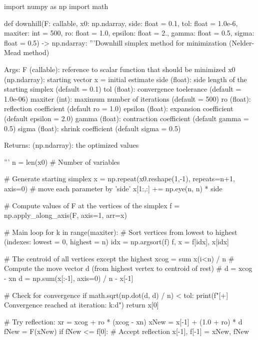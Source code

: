 \begin{python}
import numpy as np
import math

def downhill(F: callable, x0: np.ndarray,
     side: float = 0.1, tol: float = 1.0e-6, maxiter: int = 500,
     ro: float = 1.0, epsilon: float = 2.,
     gamma: float = 0.5, sigma: float = 0.5) -> np.ndarray:
    '''Downhill simplex method for minimization (Nelder-Mead method)

    Args:
        F (callable):    reference to scalar function that should be minimized
        x0 (np.ndarray): starting vector x = initial estimate
        side (float):    side length of the starting simplex (default = 0.1)
        tol (float):     convergence toelerance (default = 1.0e-06)
        maxiter (int):   maximum number of iterations (default = 500)
        ro (float):      reflection coefficient   (default ro      = 1.0)
        epsilon (float): expansion coefficient    (default epsilon = 2.0)
        gamma (float):   contraction coefficient  (default gamma   = 0.5)
        sigma (float):   shrink coefficient       (default sigma   = 0.5)

    Returns:
        (np.ndarray): the optimized values

    '''
    n = len(x0) # Number of variables

    # Generate starting simplex
    x = np.repeat(x0.reshape(1,-1), repeats=n+1, axis=0)
    # move each parameter by 'side'
    x[1:,:] += np.eye(n, n) * side

    # Compute values of F at the vertices of the simplex
    f = np.apply_along_axis(F, axis=1, arr=x)

    # Main loop
    for k in range(maxiter):
        # Sort vertices from lowest to highest (indexes: lowest = 0, highest = n)
        idx = np.argsort(f)
        f, x = f[idx], x[idx]

        # The centroid of all vertices except the highest xcog = sum x(i<n) / n
        # Compute the move vector d (from highest vertex to centroid of rest)
        # d = xcog - xn
        d = np.sum(x[:-1], axis=0) / n - x[-1]

        # Check for convergence
        if math.sqrt(np.dot(d, d) / n) < tol:
            print(f"[+] Convergence reached at iteration: {k:d}")
            return x[0]

        # Try reflection: xr = xcog + ro * (xcog - xn)
        xNew = x[-1] + (1.0 + ro) * d
        fNew = F(xNew)
        if fNew <= f[0]: # Accept reflection
            x[-1], f[-1] = xNew, fNew


\end{python}
